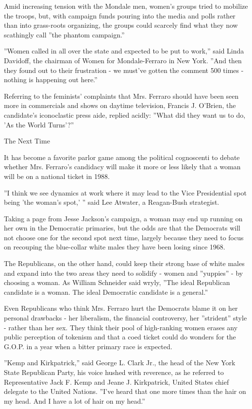 Amid increasing tension with the Mondale men, women's groups tried to
mobilize the troops, but, with campaign funds pouring into the media and
polls rather than into grass-roots organizing, the groups could scarcely
find what they now scathingly call ''the phantom campaign.''

''Women called in all over the state and expected to be put to work,''
said Linda Davidoff, the chairman of Women for Mondale-Ferraro in New
York. ''And then they found out to their frustration - we must've gotten
the comment 500 times - nothing is happening out here.''

Referring to the feminists' complaints that Mrs. Ferraro should have
been seen more in commercials and shows on daytime television, Francis
J. O'Brien, the candidate's iconoclastic press aide, replied acidly:
''What did they want us to do, 'As the World Turns'?''

The Next Time

It has become a favorite parlor game among the political cognoscenti to
debate whether Mrs. Ferraro's candidacy will make it more or less likely
that a woman will be on a national ticket in 1988.

''I think we see dynamics at work where it may lead to the Vice
Presidential spot being 'the woman's spot,' '' said Lee Atwater, a
Reagan-Bush strategist.

Taking a page from Jesse Jackson's campaign, a woman may end up running
on her own in the Democratic primaries, but the odds are that the
Democrats will not choose one for the second spot next time, largely
because they need to focus on recouping the blue-collar white males they
have been losing since 1968.

The Republicans, on the other hand, could keep their strong base of
white males and expand into the two areas they need to solidify - women
and ''yuppies'' - by choosing a woman. As William Schneider said wryly,
''The ideal Republican candidate is a woman. The ideal Democratic
candidate is a general.''

Even Republicans who think Mrs. Ferraro hurt the Democrats blame it on
her personal drawbacks - her liberalism, the financial controversy, her
''strident'' style - rather than her sex. They think their pool of
high-ranking women erases any public perception of tokenism and that a
coed ticket could do wonders for the G.O.P. in a year when a bitter
primary race is expected.

''Kemp and Kirkpatrick,'' said George L. Clark Jr., the head of the New
York State Republican Party, his voice hushed with reverence, as he
referred to Representative Jack F. Kemp and Jeane J. Kirkpatrick, United
States chief delegate to the United Nations. ''I've heard that one more
times than the hair on my head. And I have a lot of hair on my head.''

